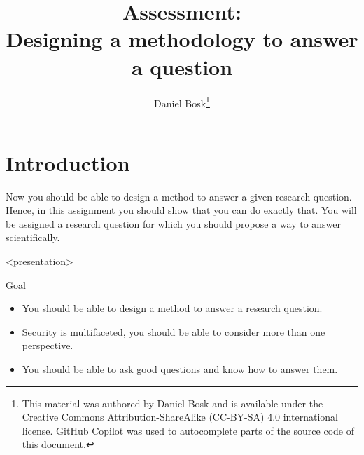 \title{%
  Assessment:\\
  Designing a methodology to answer a question
}
\author{Daniel Bosk\thanks{%
   This material was authored by Daniel Bosk and is available under the 
   Creative Commons Attribution-ShareAlike (CC-BY-SA) 4.0 international 
   license.
   GitHub Copilot was used to autocomplete parts of the source code of this 
   document.
}}

\mode*

\begin{frame}
  \maketitle
\end{frame}

\begin{abstract}
  
\end{abstract}

\clearpage


\section{Introduction}

Now you should be able to design a method to answer a given research question.
Hence, in this assignment you should show that you can do exactly that.
You will be assigned a research question for which you should propose a way to 
answer scientifically.

\begin{frame}<presentation>
  \begin{block}{Goal}
    \begin{itemize}
      \item You should be able to design a method to answer a research 
        question.
      \item Security is multifaceted, you should be able to consider more than 
        one perspective.
      \item You should be able to ask good questions and know how to answer 
        them.
    \end{itemize}
  \end{block}
\end{frame}

%
%
%

